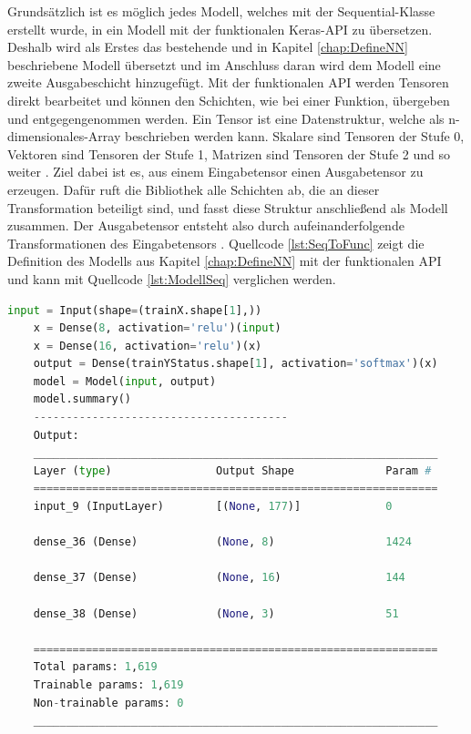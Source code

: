 Grundsätzlich ist es möglich jedes Modell, welches mit der \glqq Sequential\grqq{}-Klasse erstellt wurde, in ein Modell mit der funktionalen Keras-\ac{API} zu übersetzen. 
Deshalb wird als Erstes das bestehende und in Kapitel \ref*{chap:DefineNN} beschriebene Modell übersetzt und im Anschluss daran wird dem Modell eine zweite Ausgabeschicht
hinzugefügt.
Mit der funktionalen \ac{API} werden Tensoren direkt bearbeitet und können den Schichten, wie bei einer Funktion, übergeben und entgegengenommen werden. Ein Tensor ist eine
Datenstruktur, welche als n-dimensionales-Array beschrieben werden kann. Skalare sind Tensoren der Stufe 0, Vektoren sind Tensoren der Stufe 1, Matrizen sind Tensoren
der Stufe 2 und so weiter \cite[vgl. S.128]{AI_Huawei}. Ziel dabei ist es, 
aus einem Eingabetensor einen Ausgabetensor zu erzeugen. Dafür ruft die Bibliothek alle Schichten ab, die an dieser Transformation beteiligt sind, und fasst diese Struktur
anschließend als Modell zusammen. Der Ausgabetensor entsteht also durch aufeinanderfolgende Transformationen des Eingabetensors \cite[vgl. S.305]{DL_PY}. 
Quellcode \ref*{lst:SeqToFunc} zeigt die Definition des Modells aus Kapitel \ref*{chap:DefineNN} mit der funktionalen \ac{API} und kann mit Quellcode \ref*{lst:ModellSeq}
verglichen werden. 

\begin{lstlisting}[language = python, caption={Modell mit funktionaler \acs{API} darstellen},captionpos=b, label = lst:SeqToFunc, floatplacement=H]
    input = Input(shape=(trainX.shape[1],))
    x = Dense(8, activation='relu')(input)
    x = Dense(16, activation='relu')(x)
    output = Dense(trainYStatus.shape[1], activation='softmax')(x)
    model = Model(input, output)
    model.summary()
    ---------------------------------------
    Output:
    ______________________________________________________________
    Layer (type)                Output Shape              Param #   
    ==============================================================
    input_9 (InputLayer)        [(None, 177)]             0         
                                                                    
    dense_36 (Dense)            (None, 8)                 1424      
                                                                    
    dense_37 (Dense)            (None, 16)                144       
                                                                    
    dense_38 (Dense)            (None, 3)                 51        
                                                                    
    ==============================================================
    Total params: 1,619
    Trainable params: 1,619
    Non-trainable params: 0
    ______________________________________________________________

\end{lstlisting}

